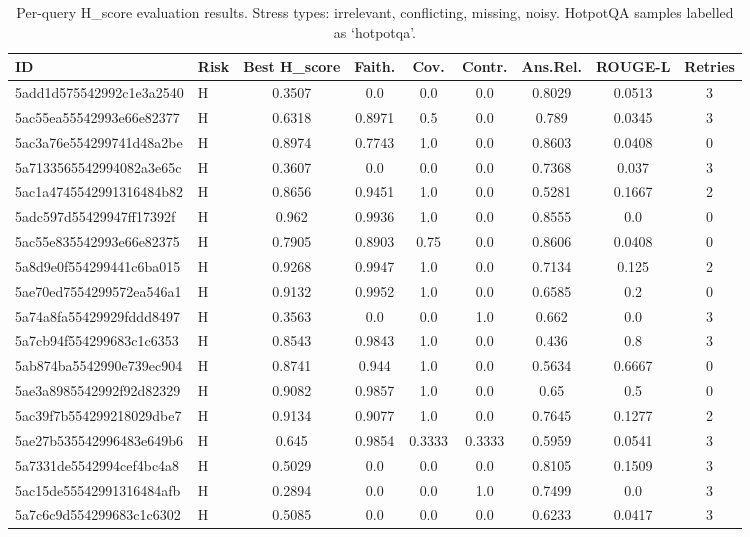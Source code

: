 \begin{table}[h]
\centering
\caption{Per-query H\_score evaluation results. Stress types: irrelevant, conflicting, missing, noisy. HotpotQA samples labelled as `hotpotqa'.}
\label{tab:hscore_results}
\begin{tabular}{llccccccc}
\hline
\textbf{ID} & \textbf{Risk} & \textbf{Best H\_score} & \textbf{Faith.} & \textbf{Cov.} & \textbf{Contr.} & \textbf{Ans.Rel.} & \textbf{ROUGE-L} & \textbf{Retries} \\
\hline
5add1d575542992c1e3a2540 & H & 0.3507 & 0.0 & 0.0 & 0.0 & 0.8029 & 0.0513 & 3 \\
5ac55ea55542993e66e82377 & H & 0.6318 & 0.8971 & 0.5 & 0.0 & 0.789 & 0.0345 & 3 \\
5ac3a76e554299741d48a2be & H & 0.8974 & 0.7743 & 1.0 & 0.0 & 0.8603 & 0.0408 & 0 \\
5a7133565542994082a3e65c & H & 0.3607 & 0.0 & 0.0 & 0.0 & 0.7368 & 0.037 & 3 \\
5ac1a4745542991316484b82 & H & 0.8656 & 0.9451 & 1.0 & 0.0 & 0.5281 & 0.1667 & 2 \\
5adc597d55429947ff17392f & H & 0.962 & 0.9936 & 1.0 & 0.0 & 0.8555 & 0.0 & 0 \\
5ac55e835542993e66e82375 & H & 0.7905 & 0.8903 & 0.75 & 0.0 & 0.8606 & 0.0408 & 0 \\
5a8d9e0f554299441c6ba015 & H & 0.9268 & 0.9947 & 1.0 & 0.0 & 0.7134 & 0.125 & 2 \\
5ae70ed7554299572ea546a1 & H & 0.9132 & 0.9952 & 1.0 & 0.0 & 0.6585 & 0.2 & 0 \\
5a74a8fa55429929fddd8497 & H & 0.3563 & 0.0 & 0.0 & 1.0 & 0.662 & 0.0 & 3 \\
5a7cb94f554299683c1c6353 & H & 0.8543 & 0.9843 & 1.0 & 0.0 & 0.436 & 0.8 & 3 \\
5ab874ba5542990e739ec904 & H & 0.8741 & 0.944 & 1.0 & 0.0 & 0.5634 & 0.6667 & 0 \\
5ae3a8985542992f92d82329 & H & 0.9082 & 0.9857 & 1.0 & 0.0 & 0.65 & 0.5 & 0 \\
5ac39f7b554299218029dbe7 & H & 0.9134 & 0.9077 & 1.0 & 0.0 & 0.7645 & 0.1277 & 2 \\
5ae27b535542996483e649b6 & H & 0.645 & 0.9854 & 0.3333 & 0.3333 & 0.5959 & 0.0541 & 3 \\
5a7331de5542994cef4bc4a8 & H & 0.5029 & 0.0 & 0.0 & 0.0 & 0.8105 & 0.1509 & 3 \\
5ac15de55542991316484afb & H & 0.2894 & 0.0 & 0.0 & 1.0 & 0.7499 & 0.0 & 3 \\
5a7c6c9d554299683c1c6302 & H & 0.5085 & 0.0 & 0.0 & 0.0 & 0.6233 & 0.0417 & 3 \\

\end{tabular}
\end{table}
